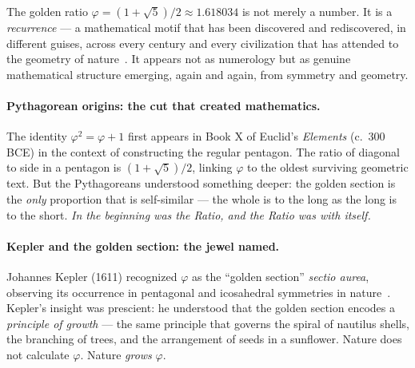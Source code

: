 \documentclass[10pt,a4paper]{article}
\begin{document}
The golden ratio $\varphi = (1+\sqrt{5})/2 \approx 1.618034$ is not merely a number.
It is a \emph{recurrence} --- a mathematical motif that has been discovered and
rediscovered, in different guises, across every century and every civilization
that has attended to the geometry of nature~\cite{olsen2026}.
It appears not as numerology but as genuine mathematical structure
emerging, again and again, from symmetry and geometry.

\paragraph{Pythagorean origins: the cut that created mathematics.}
The identity $\varphi^2 = \varphi + 1$ first appears in Book X of Euclid's
\textit{Elements} (c.~300 BCE) in the context of constructing the regular pentagon.
The ratio of diagonal to side in a pentagon is $(1+\sqrt{5})/2$, linking $\varphi$
to the oldest surviving geometric text. But the Pythagoreans understood something
deeper: the golden section is the \emph{only} proportion that is self-similar ---
the whole is to the long as the long is to the short.
\textit{In the beginning was the Ratio, and the Ratio was with itself.}

\paragraph{Kepler and the golden section: the jewel named.}
Johannes Kepler (1611) recognized $\varphi$ as the ``golden section''
\textit{sectio aurea}, observing its occurrence in pentagonal and icosahedral
symmetries in nature~\cite{olsen2026}. Kepler's insight was prescient:
he understood that the golden section encodes a \emph{principle of growth} ---
the same principle that governs the spiral of nautilus shells, the branching
of trees, and the arrangement of seeds in a sunflower.
Nature does not calculate $\varphi$. Nature \emph{grows} $\varphi$.
\end{document}
